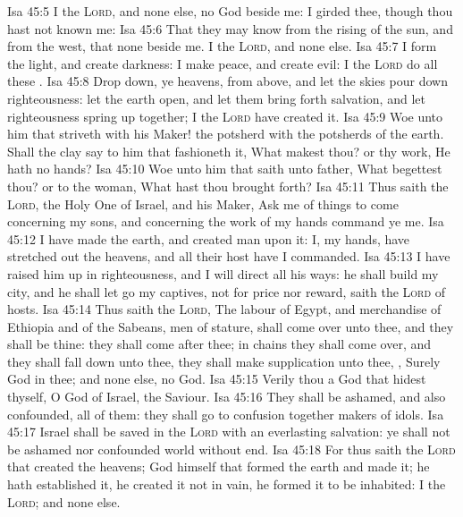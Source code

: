 \vs Isa 45:5 I  the \textsc{Lord}, and  none else,  no God beside me: I girded thee, though thou hast not known me:
\vs Isa 45:6 That they may know from the rising of the sun, and from the west, that  none beside me. I  the \textsc{Lord}, and  none else.
\vs Isa 45:7 I form the light, and create darkness: I make peace, and create evil: I the \textsc{Lord} do all these .
\vs Isa 45:8 Drop down, ye heavens, from above, and let the skies pour down righteousness: let the earth open, and let them bring forth salvation, and let righteousness spring up together; I the \textsc{Lord} have created it.
\vs Isa 45:9 Woe unto him that striveth with his Maker!  the potsherd  with the potsherds of the earth. Shall the clay say to him that fashioneth it, What makest thou? or thy work, He hath no hands?
\vs Isa 45:10 Woe unto him that saith unto  father, What begettest thou? or to the woman, What hast thou brought forth?
\vs Isa 45:11 Thus saith the \textsc{Lord}, the Holy One of Israel, and his Maker, Ask me of things to come concerning my sons, and concerning the work of my hands command ye me.
\vs Isa 45:12 I have made the earth, and created man upon it: I,  my hands, have stretched out the heavens, and all their host have I commanded.
\vs Isa 45:13 I have raised him up in righteousness, and I will direct all his ways: he shall build my city, and he shall let go my captives, not for price nor reward, saith the \textsc{Lord} of hosts.
\vs Isa 45:14 Thus saith the \textsc{Lord}, The labour of Egypt, and merchandise of Ethiopia and of the Sabeans, men of stature, shall come over unto thee, and they shall be thine: they shall come after thee; in chains they shall come over, and they shall fall down unto thee, they shall make supplication unto thee, , Surely God  in thee; and  none else,  no God.
\vs Isa 45:15 Verily thou  a God that hidest thyself, O God of Israel, the Saviour.
\vs Isa 45:16 They shall be ashamed, and also confounded, all of them: they shall go to confusion together  makers of idols.
\vs Isa 45:17  Israel shall be saved in the \textsc{Lord} with an everlasting salvation: ye shall not be ashamed nor confounded world without end.
\vs Isa 45:18 For thus saith the \textsc{Lord} that created the heavens; God himself that formed the earth and made it; he hath established it, he created it not in vain, he formed it to be inhabited: I  the \textsc{Lord}; and  none else.
